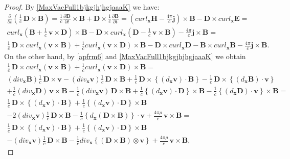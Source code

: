 \documentclass{article}
\theoremstyle{definition}
\theoremstyle{remark}
\renewcommand{\vec}[1]{\mathbf{#1}}
\newcommand{\er}{\eqref}
\newcommand{\er}{\eqref}
\begin{document}
\begin{proof}
By \er{MaxVacFull1bjkgjhjhgjaaaK} we have:
\begin{multline}\label{hvkgkjgkj}
\frac{\partial}{\partial t}\left(\frac{1}{c}\,\vec D\times \vec
B\right)=\frac{1}{c}\frac{\partial \vec D}{\partial t}\times \vec
B+\vec D\times\frac{1}{c}\frac{\partial \vec B}{\partial
t}=\left(curl_\vec x
\vec H-\frac{4\pi}{c}\vec j\right)\times \vec B-\vec D\times curl_\vec x \vec E=\\
curl_\vec x\left(\vec B+\frac{1}{c}\,\vec v\times \vec
D\right)\times \vec B-\vec D\times curl_\vec x
\left(\vec D-\frac{1}{c}\,\vec v\times \vec B\right)-\frac{4\pi}{c}\vec j\times \vec B=\\
\frac{1}{c}\,\vec D\times curl_\vec x (\vec v\times \vec
B)+\frac{1}{c}curl_\vec x (\vec v\times \vec D)\times \vec B -\vec
D\times curl_\vec x \vec D-\vec B\times curl_\vec x \vec
B-\frac{4\pi}{c}\vec j\times \vec B.
\end{multline}
On the other hand, by \er{apfrm6} and \er{MaxVacFull1bjkgjhjhgjaaaK}
we obtain
\begin{multline}\label{hvkgkjgkhjfjfj}
\frac{1}{c}\,\vec D\times curl_\vec x (\vec v\times \vec
B)+\frac{1}{c}curl_\vec x (\vec v\times
\vec D)\times \vec B=\\
(div_\vec x \vec B)\frac{1}{c}\,\vec D\times \vec v -(div_\vec x
\vec v)\frac{1}{c}\,\vec D\times \vec B +\frac{1}{c}\,\vec
D\times\left\{(d_\vec x \vec v)\cdot \vec
B\right\}-\frac{1}{c}\,\vec D\times\left\{(d_\vec x \vec B)\cdot
\vec v\right\}\\+\frac{1}{c}(div_\vec x \vec D)\,\vec v\times \vec B
-\frac{1}{c}(div_\vec x \vec v)\,\vec D\times \vec B
+\frac{1}{c}\left\{(d_\vec x \vec v)\cdot \vec D\right\}\times
\vec B-\frac{1}{c}\left\{(d_\vec x \vec D)\cdot \vec v\right\}\times \vec B=\\
 \frac{1}{c}\,\vec D\times\left\{(d_\vec x
\vec v)\cdot \vec B\right\}+\frac{1}{c}\left\{(d_\vec x \vec v)\cdot
\vec D\right\}\times \vec B\\-2(div_\vec x \vec v)\frac{1}{c}\,\vec
D\times \vec B-\frac{1}{c}\left\{d_\vec x (\vec D\times \vec
B)\right\}\cdot \vec v+\frac{4\pi\rho}{c}\,\vec v\times \vec B
=\\
\frac{1}{c}\,\vec D\times\left\{(d_\vec x \vec v)\cdot \vec
B\right\}+\frac{1}{c}\left\{(d_\vec x \vec v)\cdot \vec
D\right\}\times \vec B\\-(div_\vec x \vec v)\frac{1}{c}\,\vec
D\times \vec B-\frac{1}{c}div_\vec x\left\{(\vec D\times \vec
B)\otimes \vec v\right\}+\frac{4\pi\rho}{c}\,\vec v\times \vec B,

\end{multline}
\end{proof}
\end{document}
